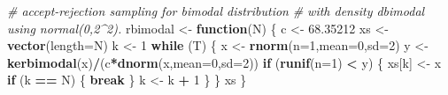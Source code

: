 \documentclass[
  10pt,
  twocolumn]{article}
\newenvironment{Shaded}{\begin{snugshade}}{\end{snugshade}}
\newcommand{\AttributeTok}[1]{\textcolor[rgb]{0.13,0.29,0.53}{#1}}
\newcommand{\CommentTok}[1]{\textcolor[rgb]{0.56,0.35,0.01}{\textit{#1}}}
\newcommand{\ControlFlowTok}[1]{\textcolor[rgb]{0.13,0.29,0.53}{\textbf{#1}}}
\newcommand{\DecValTok}[1]{\textcolor[rgb]{0.00,0.00,0.81}{#1}}
\newcommand{\FloatTok}[1]{\textcolor[rgb]{0.00,0.00,0.81}{#1}}
\newcommand{\FunctionTok}[1]{\textcolor[rgb]{0.13,0.29,0.53}{\textbf{#1}}}
\newcommand{\NormalTok}[1]{#1}
\newcommand{\OtherTok}[1]{\textcolor[rgb]{0.56,0.35,0.01}{#1}}
\newcommand{\SpecialCharTok}[1]{\textcolor[rgb]{0.81,0.36,0.00}{\textbf{#1}}}
\begin{document}
\begin{Shaded}
\begin{Highlighting}[]
\CommentTok{\# accept{-}rejection sampling for bimodal distribution}
\CommentTok{\# with density dbimodal using normal(0,2\^{}2).}
\NormalTok{rbimodal }\OtherTok{\textless{}{-}} \ControlFlowTok{function}\NormalTok{(N)}
\NormalTok{\{}
\NormalTok{  c }\OtherTok{\textless{}{-}} \FloatTok{68.35212}
\NormalTok{  xs }\OtherTok{\textless{}{-}} \FunctionTok{vector}\NormalTok{(}\AttributeTok{length=}\NormalTok{N)}
\NormalTok{  k }\OtherTok{\textless{}{-}} \DecValTok{1}
  \ControlFlowTok{while}\NormalTok{ (T)}
\NormalTok{  \{}
\NormalTok{    x }\OtherTok{\textless{}{-}} \FunctionTok{rnorm}\NormalTok{(}\AttributeTok{n=}\DecValTok{1}\NormalTok{,}\AttributeTok{mean=}\DecValTok{0}\NormalTok{,}\AttributeTok{sd=}\DecValTok{2}\NormalTok{)}
\NormalTok{    y }\OtherTok{\textless{}{-}} \FunctionTok{kerbimodal}\NormalTok{(x)}\SpecialCharTok{/}\NormalTok{(c}\SpecialCharTok{*}\FunctionTok{dnorm}\NormalTok{(x,}\AttributeTok{mean=}\DecValTok{0}\NormalTok{,}\AttributeTok{sd=}\DecValTok{2}\NormalTok{))}
    \ControlFlowTok{if}\NormalTok{ (}\FunctionTok{runif}\NormalTok{(}\AttributeTok{n=}\DecValTok{1}\NormalTok{) }\SpecialCharTok{\textless{}}\NormalTok{ y)}
\NormalTok{    \{}
\NormalTok{      xs[k] }\OtherTok{\textless{}{-}}\NormalTok{ x}
      \ControlFlowTok{if}\NormalTok{ (k }\SpecialCharTok{==}\NormalTok{ N) \{ }\ControlFlowTok{break}\NormalTok{ \}}
\NormalTok{      k }\OtherTok{\textless{}{-}}\NormalTok{ k }\SpecialCharTok{+} \DecValTok{1}
\NormalTok{    \}}
\NormalTok{  \}}
\NormalTok{  xs}
\NormalTok{\}}
\end{Highlighting}
\end{Shaded}
\end{document}
